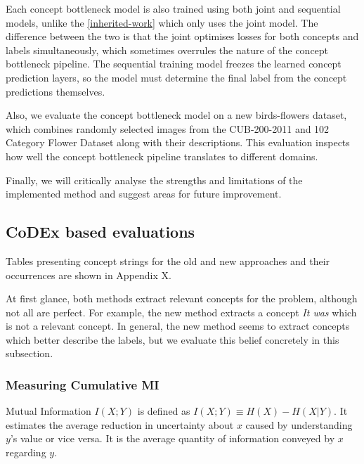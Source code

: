 Each concept bottleneck model is also trained using both joint and sequential models, unlike the \ref{inherited-work} which only uses the joint model.
The difference between the two is that the joint optimises losses for both concepts and labels simultaneously, which sometimes overrules the nature of the concept bottleneck pipeline.
The sequential training model freezes the learned concept prediction layers, so the model must determine the final label from the concept predictions themselves.

Also, we evaluate the concept bottleneck model on a new birds-flowers dataset, which combines randomly selected images from the CUB-200-2011 and 102 Category Flower Dataset along with their descriptions.
This evaluation inspects how well the concept bottleneck pipeline translates to different domains.

Finally, we will critically analyse the strengths and limitations of the implemented method and suggest areas for future improvement.

\subsection{CoDEx based evaluations}

Tables presenting concept strings for the old and new approaches and their occurrences are shown in Appendix X.

At first glance, both methods extract relevant concepts for the problem, although not all are perfect.
For example, the new method extracts a concept \emph{It was} which is not a relevant concept.
In general, the new method seems to extract concepts which better describe the labels, but we evaluate this belief concretely in this subsection.


\subsubsection{Measuring Cumulative MI}

Mutual Information $I(X;Y)$ \cite{RefWorks:RefID:30-mackay2004information} is defined as $I(X; Y) \equiv H(X) - H(X|Y)$. 
It estimates the average reduction in uncertainty about $x$ caused by understanding $y$'s value or vice versa. 
It is the average quantity of information conveyed by $x$ regarding $y$.

